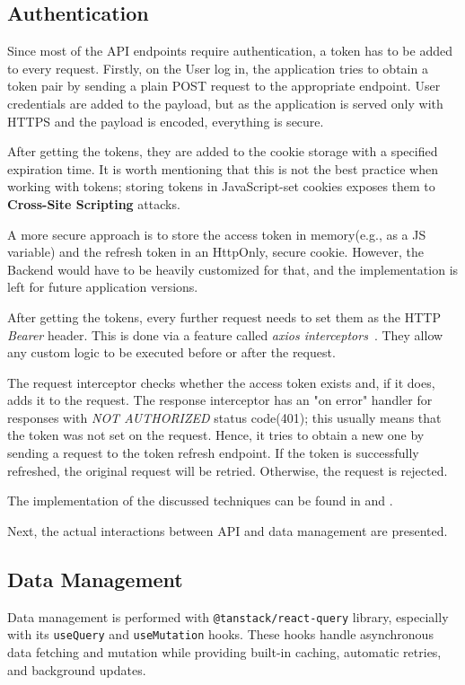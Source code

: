 \subsection{Authentication}
Since most of the API endpoints require authentication, a token has to be added to every
request. Firstly, on the User log in, the application tries to obtain a token pair by sending
a plain POST request to the appropriate endpoint. User credentials are added to the payload,
but as the application is served only with HTTPS and the payload is encoded, everything is secure.

After getting the tokens, they are added to the cookie storage with a specified expiration time.
It is worth mentioning that this is not the best practice when
working with tokens; storing tokens in JavaScript-set
cookies exposes them to \textbf{Cross-Site Scripting} attacks.

A more secure approach is to store the access token in memory(e.g., as a JS variable) and the
refresh token in an HttpOnly, secure cookie. However, the Backend would have to be heavily customized for that, and
the implementation is left for future application versions.

After getting the tokens, every further request needs to set them as the HTTP \textit{Bearer} header.
This is done via a feature called \textit{axios interceptors}~\cite{axiosintercept}.
They allow any custom logic to be executed before or after the request.

The request interceptor checks whether the access token exists and, if it does, adds it to the request.
The response interceptor has an "on error" handler for responses with \textit{NOT AUTHORIZED} status code(401); this usually means that the token was not set on the request. Hence, it tries to obtain a new one
by sending a request to the token refresh endpoint. If the token is successfully refreshed, the original request will be
retried. Otherwise, the request is rejected.

The implementation of the discussed techniques can be found in 
and .

Next, the actual interactions between API and data management are presented.

\subsection{Data Management}
Data management is performed with \texttt{@tanstack/react-query} library, especially with its
\texttt{useQuery} and \texttt{useMutation} hooks. These hooks handle asynchronous data
fetching and mutation while providing built-in caching,
automatic retries, and background updates.

